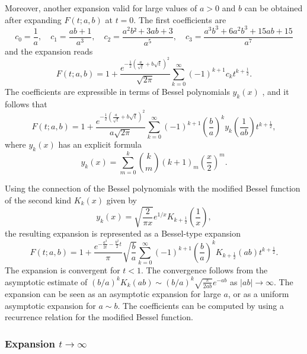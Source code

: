 \documentclass[10pt,a4paper,oneside]{article}
\numberwithin{equation}{section}
\begin{document}
Moreover, another expansion valid for large values of $a > 0$ and $b$ can be obtained after expanding $F(t;a,b)$ at $t=0$. The first coefficients are
\begin{equation}
c_0 = \frac{1}{a}, \quad c_1 = \frac{ab + 1}{a^3}, \quad c_2 = \frac{a^2b² +3ab + 3}{a^5}, \quad c_3 = \frac{a^3b^3 + 6a^2b^3 + 15ab + 15}{a^7}
\end{equation}
and the expansion reads
\begin{equation}
F(t; a, b) = 1 + \frac{e^{-\frac{1}{2} \left(\frac{a}{\sqrt{t}} + b\sqrt{t} \right)^2}}{\sqrt{2\pi}}\sum_{k=0}^{\infty}(-1)^{k+1}c_k t^{k + \frac{1}{2}}.
\end{equation}
The coefficients are expressible in terms of Bessel polynomials $y_k(x)$ \cite[\S A001498]{OEIS}, and it follows that
\begin{equation}
F(t; a, b) = 1 + \frac{e^{-\frac{1}{2} \left(\frac{a}{\sqrt{t}} + b\sqrt{t} \right)^2}}{a\sqrt{2\pi}}\sum_{k=0}^{\infty}(-1)^{k+1} \left(\frac{b}{a}\right)^k y_k\left(\frac{1}{ab}\right) t^{k + \frac{1}{2}},
\end{equation}
where $y_k(x)$ has an explicit formula
\begin{equation}
y_k(x) = \sum_{m=0}^k \binom{k}{m} (k + 1)_m \left(\frac{x}{2}\right)^m.
\end{equation}

Using the connection of the Bessel polynomials with the modified Bessel function of the second kind $K_k(x)$ given by \cite[\S 33.1.3]{Temme2015}
\begin{equation}
y_k(x) = \sqrt{\frac{2}{\pi x}}e^{1/x} K_{k + \frac{1}{2}}\left(\frac{1}{x}\right),
\end{equation}
the resulting expansion is represented as a Bessel-type expansion
\begin{equation}
F(t; a, b) = 1 + \frac{e^{-\frac{a^2}{2t} - \frac{b^2}{2}t}}{\pi}\sqrt{\frac{b}{a}}\sum_{k=0}^{\infty} (-1)^{k+1} \left(\frac{b}{a}\right)^k K_{k + \frac{1}{2}}(ab)t^{k + \frac{1}{2}}.
\end{equation}
The expansion is convergent for $t < 1$. The convergence follows from the asymptotic estimate of $(b/a)^k K_k(ab) \sim (b/a)^k \sqrt{\frac{\pi}{2ab}}e^{-ab}$ as $|ab| \to \infty$. The expansion can be seen as an asymptotic expansion for large $a$, or as a uniform asymptotic expansion for $a \sim b$. The coefficients can be computed by using a recurrence relation for the modified Bessel function.

\subsubsection{Expansion $t \to \infty$}
\end{document}
